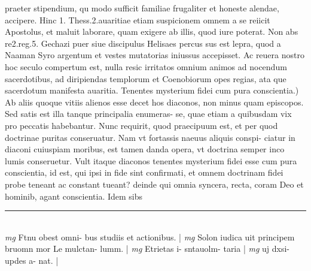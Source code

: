\documentclass{article}
\begin{document}
\begin{pages}
praeter stipendium, qu modo sufficit familiae frugaliter et honeste alendae, accipere. Hinc 1. Thess.2.auaritiae etiam suspicionem omnem a se reiicit Apostolus, et maluit laborare, quam exigere ab illis, quod iure poterat. Non abs re2.reg.5. Gechazi puer siue discipulus Helisaes percus sus est lepra, quod a Naaman Syro argentum et vestes mutatorias iniussus accepisset. Ac reuera nostro hoc seculo compertum est, nulla resic irritatos omnium animos ad nocendum sacerdotibus, ad diripiendas templorum et Coenobiorum opes regias, ata que sacerdotum manifesta auaritia.  \pend\pstart Tenentes mysterium fidei cum pura conscientia.) Ab aliis quoque vitiis alienos esse decet hos diaconos, non minus quam episcopos. Sed satis est illa tanque principalia enumeras- se, quae etiam a quibusdam vix pro peccatis habebantur. Nunc requirit, quod praecipuum est, et per quod doctrinae puritas conseruatur. Nam vt fortassis naeuus aliquis conspi- ciatur in diaconi cuiuspiam moribus, est tamen danda opera, vt doctrina semper inco lumis conseruetur. Vult itaque diaconos tenentes mysterium fidei esse cum pura conscientia, id est, qui ipsi in fide sint confirmati, et omnem doctrinam fidei probe teneant ac constant tueant? deinde qui omnia syncera, recta, coram Deo et hominib, agant conscientia. Idem sibs  \pend
\vspace{0.5cm}\noindent
\vspace{0.2cm}\rule{1cm}{0.2pt}\\ 
\hspace{0.2cm}\textit{mg}
\footnotesize Ftnu obest omni- bus studiis et actionibus. 
\normalsize| 
\hspace{0.2cm}\textit{mg}
\footnotesize Solon iudica uit principem bruomn mor Le mulctan- lumm. 
\normalsize| 
\hspace{0.2cm}\textit{mg}
\footnotesize Etrietas i- sntauolm- taria 
\normalsize| 
\hspace{0.2cm}\textit{mg}
\footnotesize uj dxsi- updes a- nat. 
\normalsize| 

\end{pages}
\end{document}
